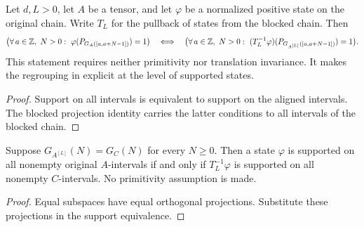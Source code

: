 \begin{lemma}
    \label{thm:mps_support_blocking_iff}
    \leanok
    Let $d,L>0$, let $A$ be a tensor, and let $\varphi$ be a normalized
    positive state on the original chain. Write $T_L$ for the pullback of
    states from the blocked chain. Then
    \begin{align}
        \bigl(\forall\,a\in\mathbb Z,\ N>0:\ \varphi(P_{G_A([a,a+N-1])})=1\bigr)
        \quad\Longleftrightarrow\quad
        \bigl(\forall\,a\in\mathbb Z,\ N>0:\
        (T_L^{-1}\varphi)(P_{G_{A^{[L]}}([a,a+N-1])})=1\bigr).
        \notag
    \end{align}
    This statement requires neither primitivity nor translation invariance.
    It makes the regrouping in
    \cite[lines~825--836 and Section~3]{Nachtergaele1996Spectral}
    explicit at the level of supported states.
\end{lemma}
\begin{proof}\leanok
    Support on all intervals is equivalent to support on the aligned
    intervals. The blocked projection identity carries the latter
    conditions to all intervals of the blocked chain.
\end{proof}

\begin{lemma}
    \label{thm:blocked_support_representation_iff}
    \leanok
    Suppose $G_{A^{[L]}}(N)=G_C(N)$ for every $N\geq0$.
    Then a state $\varphi$ is supported on all nonempty original
    $A$-intervals if and only if $T_L^{-1}\varphi$ is supported on all
    nonempty $C$-intervals. No primitivity assumption is made.
\end{lemma}
\begin{proof}\leanok
    Equal subspaces have equal orthogonal projections. Substitute these
    projections in the support equivalence.
\end{proof}

